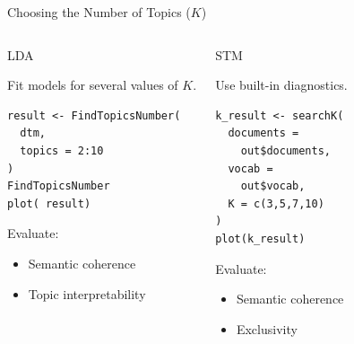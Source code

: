 \documentclass[aspectratio=169]{beamer}
\begin{document}
\begin{frame}[fragile]{Choosing the Number of Topics ($K$)}

\small

\begin{columns}[T]


\begin{block}{LDA}

Fit models for several values of $K$.

\begin{lstlisting}[style=Rstyle]
result <- FindTopicsNumber(
  dtm,
  topics = 2:10
)
FindTopicsNumber
plot( result)
\end{lstlisting}

Evaluate:

\begin{itemize}
\item Semantic coherence
\item Topic interpretability
\end{itemize}

\end{block}


\begin{block}{STM}

Use built-in diagnostics.

\begin{lstlisting}[style=Rstyle]
k_result <- searchK(
  documents =
    out$documents,
  vocab =
    out$vocab,
  K = c(3,5,7,10)
)
plot(k_result)
\end{lstlisting}

Evaluate:

\begin{itemize}
\item Semantic coherence
\item Exclusivity
\end{itemize}

\end{block}

\end{columns}

\end{frame}
\end{document}
